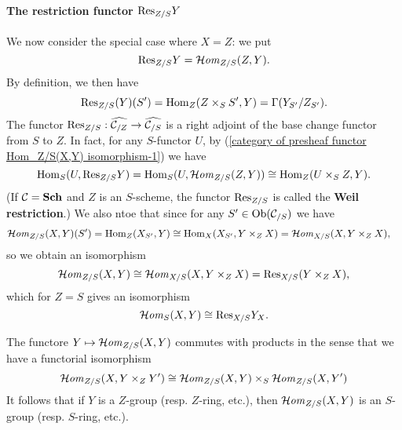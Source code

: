 \paragraph{The restriction functor $\Res_{Z/S}Y$} We now consider the special case where $X=Z$: we put
\[\Res_{Z/S}Y=\sHom_{Z/S}(Z,Y).\]
By definition, we then have
\[\Res_{Z/S}(Y)(S')=\Hom_Z(Z\times_SS',Y)=\Gamma(Y_{S'}/Z_{S'}).\]
The functor $\Res_{Z/S}:\widehat{\mathcal{C}_{/Z}}\to\widehat{\mathcal{C}_{/S}}$ is a right adjoint of the base change functor from $S$ to $Z$. In fact, for any $S$-functor $U$, by (\ref{category of presheaf functor Hom_Z/S(X,Y) isomorphism-1}) we have
\[\Hom_S(U,\Res_{Z/S}Y)=\Hom_S(U,\sHom_{Z/S}(Z,Y))\cong\Hom_Z(U\times_SZ,Y).\]
(If $\mathcal{C}=\Sch$ and $Z$ is an $S$-scheme, the functor $\Res_{Z/S}$ is called the \textbf{Weil restriction}.) We also ntoe that since for any $S'\in\Ob(\mathcal{C}_{/S})$ we have 
\begin{align*}
\sHom_{Z/S}(X,Y)(S')&=\Hom_{Z}(X_{S'},Y)\cong\Hom_X(X_{S'},Y\times_ZX)=\sHom_{X/S}(X,Y\times_ZX),
\end{align*}
so we obtain an isomorphism
\[\sHom_{Z/S}(X,Y)\cong\sHom_{X/S}(X,Y\times_ZX)=\Res_{X/S}(Y\times_ZX),\]
which for $Z=S$ gives an isomorphism 
\[\sHom_S(X,Y)\cong \Res_{X/S}Y_X.\]

\begin{remark}\label{category of presheaf functor Hom product commutes}
The functore $Y\mapsto\sHom_{Z/S}(X,Y)$ commutes with products in the sense that we have a functorial isomorphism
\begin{equation}\label{category of presheaf functor Hom product commutes-1}
\sHom_{Z/S}(X,Y\times_ZY')\cong\sHom_{Z/S}(X,Y)\times_S\sHom_{Z/S}(X,Y')
\end{equation}
It follows that if $Y$ is a $Z$-group (resp. $Z$-ring, etc.), then $\sHom_{Z/S}(X,Y)$ is an $S$-group (resp. $S$-ring, etc.).
\end{remark}

